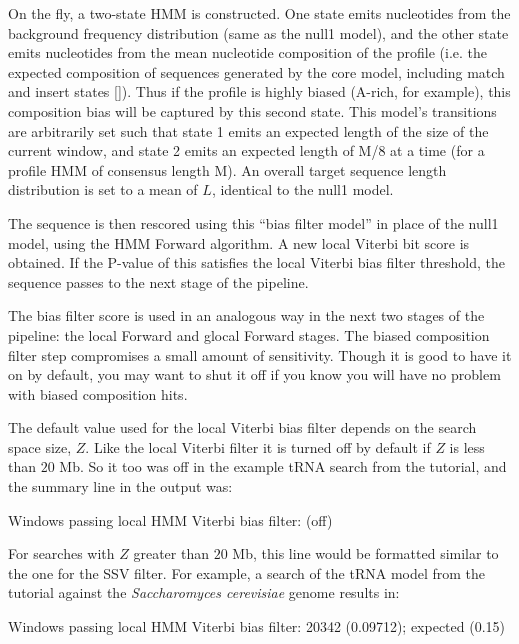 On the fly, a two-state HMM is constructed. One state emits nucleotides
from the background frequency distribution (same as the null1 model),
and the other state emits nucleotides from the mean nucleotide composition
of the profile (i.e. the expected composition of sequences generated
by the core model, including match and insert states
[]). Thus if the profile is
highly biased (A-rich, for example), this composition bias will be captured
by this second state. This model's transitions are arbitrarily set
such that state 1 emits an expected length of the size of the current
window, and state
2 emits an expected length of M/8 at a time (for a profile HMM of
consensus length
M). An overall target sequence length distribution is set to a mean of
$L$, identical to the null1 model.

The sequence is then rescored using this ``bias filter model'' in
place of the null1 model, using the HMM Forward algorithm.  A new
local Viterbi bit score is obtained. If the P-value of this satisfies
the local Viterbi bias filter threshold, the sequence passes to the
next stage of the pipeline.

The bias filter score is used in an analogous way in the next two
stages of the pipeline: the local Forward and glocal Forward stages.
The biased composition filter step compromises a small amount of
sensitivity.  Though it is good to have it on by default, you may want
to shut it off if you know you will have no problem with biased
composition hits.

The default value used for the local Viterbi bias filter depends on
the search space size, $Z$. Like the local Viterbi filter it is turned
off by default if $Z$ is less than $20$ Mb. So it too was off in the
example tRNA search from the tutorial, and the summary line in the
output was:

\begin{sreoutput}
Windows   passing  local HMM Viterbi  bias filter:                  (off)
\end{sreoutput}

For searches with $Z$ greater than $20$ Mb, this line would be
formatted similar to the one for the SSV filter. For example,
a search of the tRNA model from the tutorial against the
\emph{Saccharomyces cerevisiae} genome results in:

\begin{sreoutput}
Windows   passing  local HMM Viterbi  bias filter:           20342  (0.09712); expected (0.15)
\end{sreoutput}

